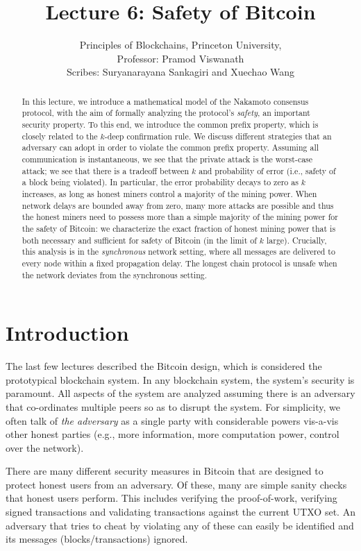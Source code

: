 \documentclass{article}
\title{Lecture 6:   Safety of Bitcoin}
\author{Principles of Blockchains, Princeton University,  \\ Professor:  Pramod Viswanath \\ Scribes: Suryanarayana Sankagiri and Xuechao Wang}
\begin{document}
\maketitle

\begin{abstract}
In this lecture, we introduce a mathematical model of the Nakamoto consensus protocol, with the aim of formally analyzing the protocol's {\em safety}, an important security property. To this end, we introduce the common prefix property, which is closely related to the  $k$-deep confirmation rule. We discuss different strategies that an adversary can adopt in order to violate the common prefix property. Assuming all communication is instantaneous, we see that the private attack is  the worst-case attack; we see that there is a tradeoff between $k$ and probability of error (i.e., safety of a block being violated).  In particular, the error probability decays to zero as $k$ increases, as long as honest miners control a majority of the mining power. When network delays are bounded away from zero, many more attacks are possible and thus the honest miners need to possess more than a simple majority of the mining power for the safety of Bitcoin: we characterize the exact fraction of honest mining power that is both necessary and sufficient for safety of Bitcoin (in the limit of $k$ large). Crucially,  this analysis is in the {\em synchronous} network setting, where all messages are delivered to every node within a fixed propagation delay. The longest chain protocol is unsafe when the network deviates from the synchronous setting. 
\end{abstract}

\section*{Introduction} 
The last few lectures described the Bitcoin design, which is considered the prototypical blockchain system. In any blockchain system, the system's security is paramount. All aspects of the system are analyzed assuming there is an adversary that co-ordinates multiple peers so as to disrupt the system. For simplicity, we often talk of \textit{the adversary} as a single party with considerable powers vis-a-vis other honest parties (e.g., more information, more computation power, control over the network).  

There are many different security measures in Bitcoin that are designed to protect honest users from an adversary. Of these, many are simple sanity checks that honest users perform. This includes verifying the proof-of-work, verifying signed transactions and validating transactions against the current UTXO set. An adversary that tries to cheat by violating any of these can easily be identified and its messages (blocks/transactions) ignored.
\end{document}
